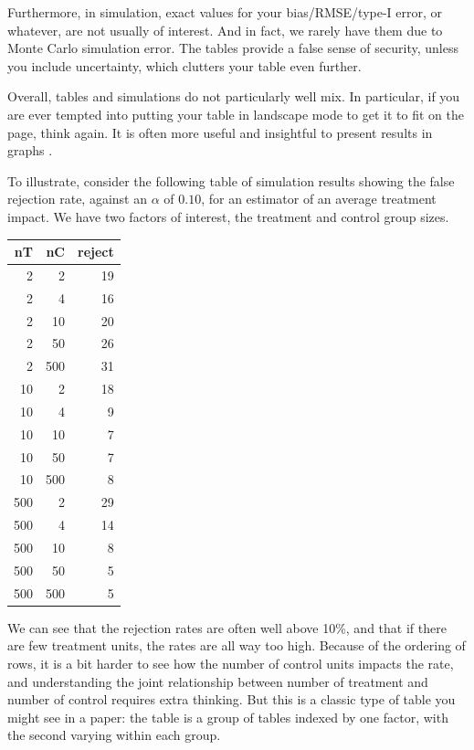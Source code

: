 \documentclass[
]{book}
\begin{document}
Furthermore, in simulation, exact values for your bias/RMSE/type-I error, or whatever, are not usually of interest. And in fact, we rarely have them due to Monte Carlo simulation error.
The tables provide a false sense of security, unless you include uncertainty, which clutters your table even further.

Overall, tables and simulations do not particularly well mix.
In particular, if you are ever tempted into putting your table in landscape mode to get it to fit on the page, think again.
It is often more useful and insightful to present results in graphs \citep{gelman2002let}.

To illustrate, consider the following table of simulation results showing the false rejection rate, against an \(\alpha\) of \(0.10\), for an estimator of an average treatment impact.
We have two factors of interest, the treatment and control group sizes.

\begin{tabular}{r|r|r}
\hline
nT & nC & reject\\
\hline
2 & 2 & 19\\
\hline
2 & 4 & 16\\
\hline
2 & 10 & 20\\
\hline
2 & 50 & 26\\
\hline
2 & 500 & 31\\
\hline
10 & 2 & 18\\
\hline
10 & 4 & 9\\
\hline
10 & 10 & 7\\
\hline
10 & 50 & 7\\
\hline
10 & 500 & 8\\
\hline
500 & 2 & 29\\
\hline
500 & 4 & 14\\
\hline
500 & 10 & 8\\
\hline
500 & 50 & 5\\
\hline
500 & 500 & 5\\
\hline
\end{tabular}

We can see that the rejection rates are often well above 10\%, and that if there are few treatment units, the rates are all way too high.
Because of the ordering of rows, it is a bit harder to see how the number of control units impacts the rate, and understanding the joint relationship between number of treatment and number of control requires extra thinking.
But this is a classic type of table you might see in a paper: the table is a group of tables indexed by one factor, with the second varying within each group.
\end{document}
